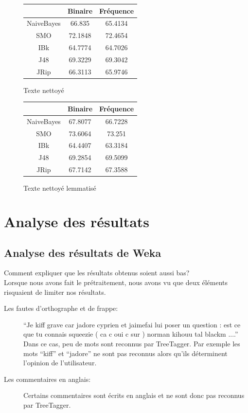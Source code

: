 \documentclass[a4paper, 11pt]{article}
\begin{document}
\begin{figure}[h]
\begin{minipage}{0.5\textwidth}
\begin{tabular}{|c|c|c|}
\hline
 & Binaire & Fréquence \\
 \hline
 NaiveBayes & 66.835 & 65.4134 \\
 \hline
 SMO & 72.1848 & 72.4654 \\
 \hline
 IBk & 64.7774 & 64.7026 \\
 \hline
 J48 & 69.3229 & 69.3042 \\
 \hline
 JRip & 66.3113 & 65.9746 \\
 \hline
\end{tabular}
\caption{Texte nettoyé}
\end{minipage}
\begin{minipage}{0.5\textwidth}
\begin{tabular}{|c|c|c|}
\hline
 & Binaire & Fréquence \\
 \hline
 NaiveBayes & 67.8077 & 66.7228 \\
 \hline
 SMO & 73.6064 & 73.251 \\
 \hline
 IBk & 64.4407 & 63.3184 \\
 \hline
 J48 & 69.2854 & 69.5099 \\
 \hline
 JRip & 67.7142 & 67.3588 \\
 \hline
\end{tabular}
\caption{Texte nettoyé lemmatisé}
\end{minipage}
\end{figure}




\section{Analyse des résultats}

\subsection{Analyse des résultats de Weka}
Comment expliquer que les résultats obtenus soient aussi bas?\\

Lorsque nous avons fait le prétraitement, nous avons vu que deux éléments risquaient de limiter nos résultats.

\begin{description}
	\item [Les fautes d'orthographe et de frappe: ]``Je kiff grave car jadore cyprien et jaimefai lui poser un question : est ce que tu connais squeezie ( ca c oui c sur ) norman kihouu tal blackm ....''\\
	
	Dans ce cas, peu de mots sont reconnus par TreeTagger. Par exemple les mots ``kiff'' et ``jadore'' ne sont pas reconnus alors qu'ils déterminent l'opinion de l'utilisateur.
	
	\item [Les commentaires en anglais: ]Certains commentaires sont écrits en anglais et ne sont donc pas reconnus par TreeTagger.
\end{description}
\end{document}
